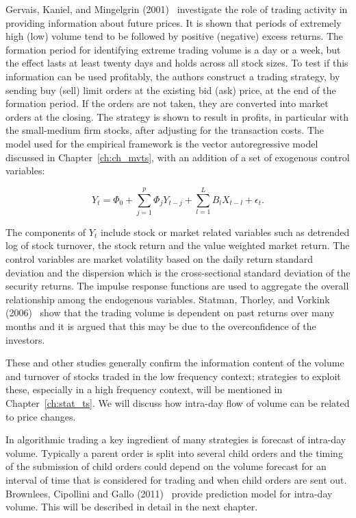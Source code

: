 Gervais, Kaniel, and Mingelgrin (2001)~\cite{gervais2001high} investigate the role of trading activity in providing information about future prices. It is shown that periods of extremely high (low) volume tend to be followed by positive (negative) excess returns. The formation period for identifying extreme trading volume is a day or a week, but the effect lasts at least twenty days and holds across all stock sizes. To test if this information can be used profitably, the authors construct a trading strategy, by sending buy (sell) limit orders at the existing bid (ask) price, at the end of the formation period. If the orders are not taken, they are converted into market orders at the closing. The strategy is shown to result in profits, in particular with the small-medium firm stocks, after adjusting for the transaction costs. The model used for the empirical framework is the vector autoregressive model discussed in Chapter~\ref{ch:ch_mvts}, with an addition of a set of exogenous control variables:

	\begin{equation} \label{eqn:2Ytphi}
	Y_t = \Phi_0 + \sum_{j=1}^p \Phi_j Y_{t-j} + \sum_{l=1}^L B_l X_{t-l} + \epsilon_t.
	\end{equation}


The components of $Y_t$ include stock or market related variables such as detrended log of stock turnover, the stock return and the value weighted market return. The control variables are market volatility based on the daily return standard deviation and the dispersion which is the cross-sectional standard deviation of the security returns. The impulse response functions are used to aggregate the overall relationship among the endogenous variables. Statman, Thorley, and Vorkink (2006)~\cite{statman2006investor} show that the trading volume is dependent on past returns over many months and it is argued that this may be due to the overconfidence of the investors.


These and other studies generally confirm the information content of the volume and turnover of stocks traded in the low frequency context; strategies to exploit these, especially in a high frequency context, will be mentioned in Chapter~\ref{ch:stat_ts}. We will discuss how intra-day flow of volume can be related to price changes. 


In algorithmic trading a key ingredient of many strategies is forecast of intra-day volume. Typically a parent order is split into several child orders and the timing of the submission of child orders could depend on the volume forecast for an interval of time that is considered for trading and when child orders are sent out. Brownlees, Cipollini and Gallo (2011)~\cite{brownless} provide prediction model for intra-day volume. This will be described in detail in the next chapter.


